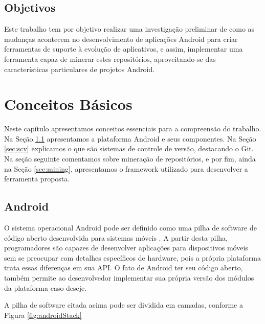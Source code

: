 \documentclass[a4paper,12pt]{article}
\begin{document}

\subsection{Objetivos}

Este trabalho tem por objetivo realizar uma investigação preliminar de como as mudanças acontecem no desenvolvimento de aplicações Android para criar ferramentas de suporte à evolução de aplicativos, e assim, implementar uma ferramenta capaz de minerar estes repositórios, aproveitando-se das características particulares de projetos Android.\\



\newpage

\section{Conceitos Básicos}

Neste capítulo apresentamos conceitos essenciais para a compreensão do trabalho. Na Seção \ref{sec:android} apresentamos a plataforma Android e seus componentes. Na Seção \ref{sec:scv} explicamos o que são sistemas de controle de versão, destacando o Git.  Na seção seguinte comentamos sobre mineração de repositórios, e por fim, ainda na Seção \ref{sec:mining}, apresentamos o framework utilizado para desenvolver a ferramenta proposta.

\subsection{Android}%
\label{sec:android}
O sistema operacional Android pode ser definido como uma pilha de software de código aberto desenvolvida para sistemas móveis \cite{androidSource}. A partir desta pilha, programadores são capazes de desenvolver aplicações para dispositivos móveis sem se preocupar com detalhes específicos de hardware, pois a própria plataforma trata essas diferenças em sua API. O fato de Android ter seu código aberto, também permite ao desenvolvedor implementar sua própria versão dos módulos da plataforma caso deseje.

A pilha de software citada acima pode ser dividida em camadas, conforme a Figura \ref{fig:androidStack}
\end{document}
